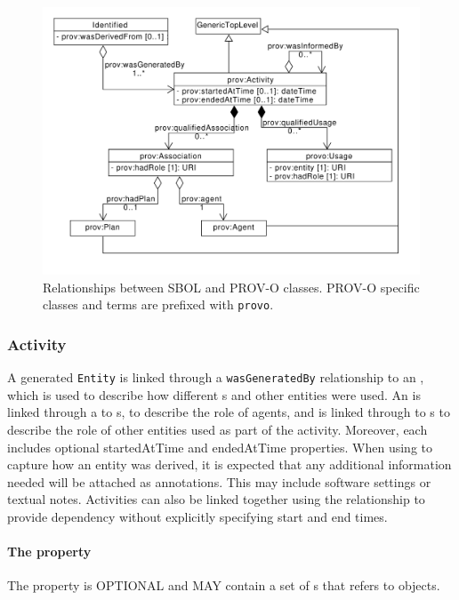 {\begin{figure}[ht]
\begin{center}
\includegraphics[scale=0.6]{uml/provenance}
\caption[]{Relationships between SBOL and PROV-O classes. PROV-O specific classes and terms are prefixed with \texttt{provo}.}
\label{uml:provenance}
\end{center}
\end{figure}

\subsubsection{Activity}
\label{sec:Activity}
A generated \texttt{Entity} is linked through a \texttt{wasGeneratedBy} relationship to an , which is used to describe how different s and other entities were used. An  is linked through a  to s, to describe the role of agents, and is linked through  to s to describe the role of other entities used as part of the activity. Moreover, each  includes optional startedAtTime and endedAtTime properties. When using  to capture how an entity was derived, it is expected that any additional information needed will be attached as annotations. This may include software settings or textual notes. Activities can also be linked together using the  relationship to provide dependency without explicitly specifying start and end times.

\paragraph{The  property}\label{sec:qualifiedAssociation}
The  property is OPTIONAL and MAY contain a set of s that refers to  objects.

}
